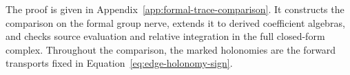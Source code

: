 The proof is given in Appendix~\ref{app:formal-trace-comparison}.
It constructs the comparison on the formal group nerve, extends it to
derived coefficient algebras, and checks source evaluation and relative
integration in the full closed-form complex.  Throughout the comparison,
the marked holonomies are the forward transports fixed in
Equation~\eqref{eq:edge-holonomy-sign}.
